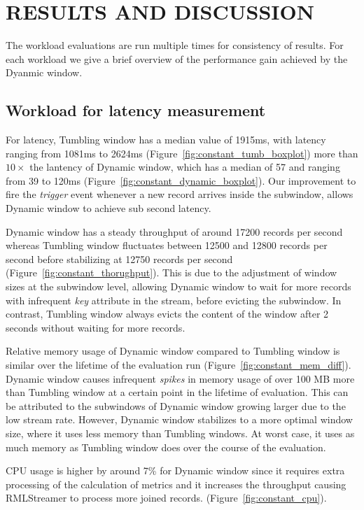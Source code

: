 \section{RESULTS AND DISCUSSION}%
\label{chap:Results and Discussion}

The workload evaluations are run multiple times for consistency of results. 
For each workload we give a brief overview of the performance gain 
achieved by the Dyanmic window. 

\subsection{Workload for latency measurement}%
\label{sec:Results Workload for latency measurement}
For latency, Tumbling window has a median value of 1915ms, 
with latency ranging from 1081ms to 2624ms (Figure~\ref{fig:constant_tumb_boxplot})
more than $10\times$ the lantency of Dynamic window, which has a median 
of 57 and ranging from 39 to 120ms (Figure~\ref{fig:constant_dynamic_boxplot}). 
Our improvement to fire the \emph{trigger} event whenever a
new record arrives inside the 
subwindow, allows 
Dynamic window to achieve sub second latency. 

Dynamic window has a 
steady throughput of around 17200 records per second whereas Tumbling window fluctuates between 
12500 and 12800 records per second before stabilizing at 12750 records per second (Figure~\ref{fig:constant_thorughput}). 
This is due to the adjustment of window sizes at the subwindow level, allowing Dynamic window to wait for more records 
with infrequent \emph{key} attribute in the stream, before evicting the subwindow. 
In contrast, Tumbling window 
always evicts the content of the window after 2 seconds without waiting for more 
records.

Relative memory usage of Dynamic window compared to Tumbling window 
is similar over the lifetime of the 
evaluation run (Figure~\ref{fig:constant_mem_diff}). 
Dynamic window causes infrequent \emph{spikes} in memory usage of over
100 MB more than Tumbling window at a certain point in the lifetime of evaluation. 
This can be attributed 
to the subwindows of Dynamic window growing larger due to the low stream 
rate. However,
Dynamic window stabilizes to a more optimal 
window size, where it uses less memory than Tumbling windows. 
At worst case, it uses as much memory as Tumbling window does over the course of the evaluation. 

CPU usage is higher by around 7\% for Dynamic window since it requires extra processing of the calculation of metrics and 
it increases the throughput causing RMLStreamer to process more joined records.
(Figure~\ref{fig:constant_cpu}). 

